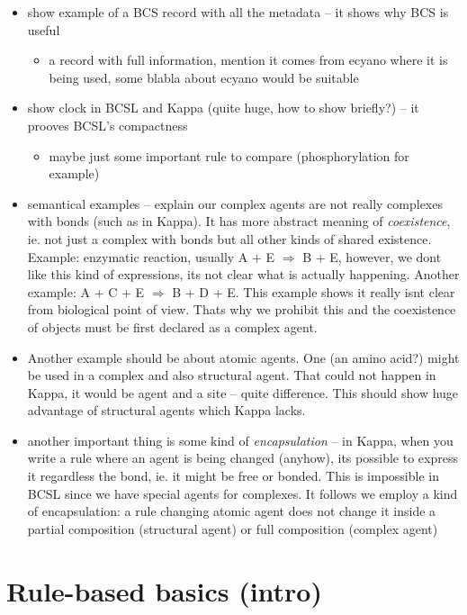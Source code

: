 \documentclass{elsarticle}
\begin{document}
\begin{itemize}
	\item show example of a BCS record with all the metadata -- it shows why BCS is useful
	\begin{itemize}
		\item a record with full information, mention it comes from ecyano where it is being used, some blabla about ecyano would be suitable
	\end{itemize}
	\item show clock in BCSL and Kappa (quite huge, how to show briefly?) -- it prooves BCSL's compactness
	\begin{itemize}
		\item maybe just some important rule to compare (phosphorylation for example)
	\end{itemize}
	\item semantical examples -- explain our complex agents are not really complexes with bonds (such as in Kappa). It has more abstract meaning of \emph{coexistence}, ie. not just a complex with bonds but all other kinds of shared existence. Example: enzymatic reaction, usually A + E $\Rightarrow$ B + E, however, we dont like this kind of expressions, its not clear what is actually happening. Another example: A + C + E $\Rightarrow$ B + D + E. This example shows it really isnt clear from biological point of view. Thats why we prohibit this and the coexistence of objects must be first declared as a complex agent. 
	\item Another example should be about atomic agents. One (an amino acid?) might be used in a complex and also structural agent. That could not happen in Kappa, it would be agent and a site -- quite difference. This should show huge advantage of structural agents which Kappa lacks. 
	\item another important thing is some kind of \emph{encapsulation} -- in Kappa, when you write a rule where an agent is being changed (anyhow), its possible to express it regardless the bond, ie. it might be free or bonded. This is impossible in BCSL since we have special agents for complexes. It follows we employ a kind of encapsulation: a rule changing atomic agent does not change it inside a partial composition (structural agent) or full composition (complex agent)
\end{itemize}

\section{Rule-based basics (intro)}
\end{document}
